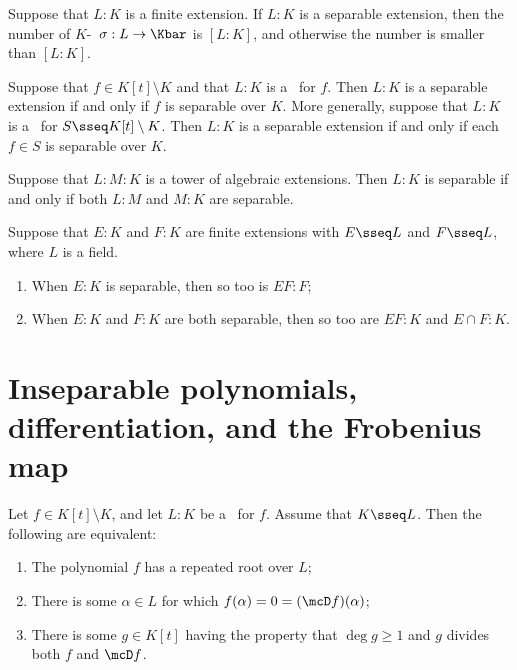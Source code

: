 \documentclass{article}
\begin{document}
  \begin{corollary}
    Suppose that $L:K$ is a finite extension. If $L:K$ is a separable extension, then the number of $K$-\homo~$\sigma:L\to\Kbar$ is $[L:K]$, and otherwise the number is smaller than $[L:K]$.
  \end{corollary}

  \begin{corollary}
    Suppose that $f\in K[t]\setminus K$ and that $L:K$ is a \sfe~for $f$. Then $L:K$ is a separable extension if and only if $f$ is separable over $K$. More generally, suppose that $L:K$ is a \sfe~for $S\sseq K[t]\setminus K$. Then $L:K$ is a separable extension if and only if each $f\in S$ is separable over $K$.
  \end{corollary}

  \begin{theorem}
    Suppose that $L:M:K$ is a tower of algebraic extensions. Then $L:K$ is separable if and only if both $L:M$ and $M:K$ are separable.
  \end{theorem}

  \begin{theorem}
    Suppose that $E:K$ and $F:K$ are finite extensions with $E\sseq L$ and $F\sseq L$, where $L$ is a field.
    \begin{enumerate}[label=(\alph*)]
      \item When $E:K$ is separable, then so too is $EF:F$;
      \item When $E:K$ and $F:K$ are both separable, then so too are $EF:K$ and $E\cap F:K$.
    \end{enumerate}
  \end{theorem}

\section{Inseparable polynomials, differentiation, and the Frobenius map}
  \begin{theorem}
    Let $f\in K[t]\setminus K$, and let $L:K$ be a \sfe~for $f$. Assume that $K\sseq L$. Then the following are equivalent:
    \begin{enumerate}[label=(\roman*)]
      \item The polynomial $f$ has a repeated root over $L$;
      \item There is some $\alpha\in L$ for which $f(\alpha)=0=(\mcD f)(\alpha)$;
      \item There is some $g\in K[t]$ having the property that $\deg g\geq 1$ and $g$ divides both $f$ and $\mcD f$.
    \end{enumerate}
  \end{theorem}
\end{document}

